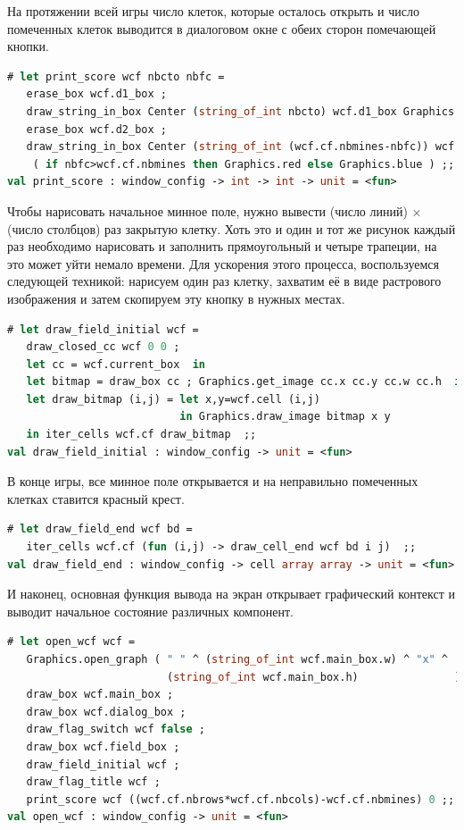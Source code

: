 На протяжении всей игры число клеток, которые осталось открыть и число
помеченных клеток выводится в диалоговом окне с обеих сторон помечающей кнопки.

\begin{lstlisting}[language=OCaml]
# let print_score wcf nbcto nbfc =
   erase_box wcf.d1_box ;
   draw_string_in_box Center (string_of_int nbcto) wcf.d1_box Graphics.blue ;
   erase_box wcf.d2_box ;
   draw_string_in_box Center (string_of_int (wcf.cf.nbmines-nbfc)) wcf.d2_box 
    ( if nbfc>wcf.cf.nbmines then Graphics.red else Graphics.blue ) ;;
val print_score : window_config -> int -> int -> unit = <fun>
\end{lstlisting}

Чтобы нарисовать начальное минное поле, нужно вывести (число линий) $\times$ 
(число столбцов) раз закрытую клетку. Хоть это и один и тот же рисунок каждый 
раз необходимо нарисовать и заполнить прямоугольный и четыре трапеции, на это 
может уйти немало времени. Для ускорения этого процесса, воспользуемся 
следующей техникой: нарисуем один раз клетку, захватим её в виде растрового 
изображения и затем скопируем эту кнопку в нужных местах.

\begin{lstlisting}[language=OCaml]
# let draw_field_initial wcf =
   draw_closed_cc wcf 0 0 ;
   let cc = wcf.current_box  in
   let bitmap = draw_box cc ; Graphics.get_image cc.x cc.y cc.w cc.h  in
   let draw_bitmap (i,j) = let x,y=wcf.cell (i,j)
                           in Graphics.draw_image bitmap x y 
   in iter_cells wcf.cf draw_bitmap  ;;
val draw_field_initial : window_config -> unit = <fun>
\end{lstlisting}

В конце игры, все минное поле открывается и на неправильно помеченных клетках 
ставится красный крест.

\begin{lstlisting}[language=OCaml]
# let draw_field_end wcf bd = 
   iter_cells wcf.cf (fun (i,j) -> draw_cell_end wcf bd i j)  ;;
val draw_field_end : window_config -> cell array array -> unit = <fun>
\end{lstlisting}

И наконец, основная функция вывода на экран открывает графический контекст и 
выводит начальное состояние различных компонент.

\begin{lstlisting}[language=OCaml]
# let open_wcf wcf =
   Graphics.open_graph ( " " ^ (string_of_int wcf.main_box.w) ^ "x" ^
                         (string_of_int wcf.main_box.h)               ) ;
   draw_box wcf.main_box ;
   draw_box wcf.dialog_box ;
   draw_flag_switch wcf false ;
   draw_box wcf.field_box ;
   draw_field_initial wcf ;
   draw_flag_title wcf ;
   print_score wcf ((wcf.cf.nbrows*wcf.cf.nbcols)-wcf.cf.nbmines) 0 ;;
val open_wcf : window_config -> unit = <fun>
\end{lstlisting}

